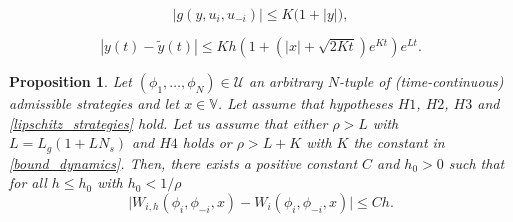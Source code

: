 \documentclass[10pt,a4paper]{amsart}
\newtheorem{proposition}{Proposition}
\begin{document}
\begin{equation}\label{bound_dynamics}
|g(y,u_{i},u_{-i})|\le K\big(1+|y|\bigr),
\end{equation}

\begin{equation}\label{estimacion_dynamics}
|y(t)-\tilde y(t)|\le K h\left(1+(|x|+\sqrt{2Kt})e^{Kt}\right)e^{Lt}.
\end{equation}

\begin{proposition}\label{consitency_with_order}
Let  $(\phi_1,\dots,\phi_N)\in\mathcal{U}$ an arbitrary $N$-tuple of {(time-continuous)} admissible strategies and let $x\in\mathbb{V}$. Let assume that hypotheses $H1$, $H2$, $H3$ and \eqref{lipschitz_strategies} hold.
Let us assume that either {$\rho> L$} with $L=L_g(1+LN_s)$ and $H4$ holds or {$\rho>L+K$} with $K$ the constant in \eqref{bound_dynamics}.  Then, there exists a
positive constant $C$ and $h_0>0$ such that for all $h\le h_0$ {with $h_0<1/\rho$}
\begin{equation*}
\bigl|W_{i,h}(\phi_i,\phi_{-i},x)-W_i(\phi_i,\phi_{-i},x)\bigr |\le C h.
\end{equation*}
\end{proposition}
\end{document}
